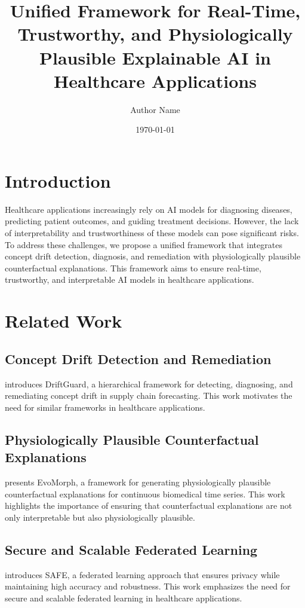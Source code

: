 \documentclass{article}
\title{Unified Framework for Real-Time, Trustworthy, and Physiologically Plausible Explainable AI in Healthcare Applications}
\author{Author Name}
\date{\today}
\begin{document}
\maketitle

\section{Introduction}
Healthcare applications increasingly rely on AI models for diagnosing diseases, predicting patient outcomes, and guiding treatment decisions. However, the lack of interpretability and trustworthiness of these models can pose significant risks. To address these challenges, we propose a unified framework that integrates concept drift detection, diagnosis, and remediation with physiologically plausible counterfactual explanations. This framework aims to ensure real-time, trustworthy, and interpretable AI models in healthcare applications.

\section{Related Work}
\subsection{Concept Drift Detection and Remediation}
\cite{alam2026driftguardhierarchicalframeworkconcept} introduces DriftGuard, a hierarchical framework for detecting, diagnosing, and remediating concept drift in supply chain forecasting. This work motivates the need for similar frameworks in healthcare applications.

\subsection{Physiologically Plausible Counterfactual Explanations}
\cite{ceylan2026evomorphcounterfactualexplanationscontinuous} presents EvoMorph, a framework for generating physiologically plausible counterfactual explanations for continuous biomedical time series. This work highlights the importance of ensuring that counterfactual explanations are not only interpretable but also physiologically plausible.

\subsection{Secure and Scalable Federated Learning}
\cite{jia2026safeseecureaccuratefederated} introduces SAFE, a federated learning approach that ensures privacy while maintaining high accuracy and robustness. This work emphasizes the need for secure and scalable federated learning in healthcare applications.
\end{document}
